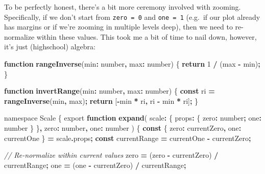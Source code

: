 \documentclass[
]{book}
\newenvironment{Shaded}{\begin{snugshade}}{\end{snugshade}}
\newcommand{\AttributeTok}[1]{\textcolor[rgb]{0.13,0.29,0.53}{#1}}
\newcommand{\CommentTok}[1]{\textcolor[rgb]{0.56,0.35,0.01}{\textit{#1}}}
\newcommand{\ControlFlowTok}[1]{\textcolor[rgb]{0.13,0.29,0.53}{\textbf{#1}}}
\newcommand{\DataTypeTok}[1]{\textcolor[rgb]{0.13,0.29,0.53}{#1}}
\newcommand{\DecValTok}[1]{\textcolor[rgb]{0.00,0.00,0.81}{#1}}
\newcommand{\FunctionTok}[1]{\textcolor[rgb]{0.13,0.29,0.53}{\textbf{#1}}}
\newcommand{\ImportTok}[1]{#1}
\newcommand{\KeywordTok}[1]{\textcolor[rgb]{0.13,0.29,0.53}{\textbf{#1}}}
\newcommand{\NormalTok}[1]{#1}
\newcommand{\OperatorTok}[1]{\textcolor[rgb]{0.81,0.36,0.00}{\textbf{#1}}}
\theoremstyle{definition}
\theoremstyle{definition}
\theoremstyle{definition}
\theoremstyle{definition}
\theoremstyle{remark}
\begin{document}
To be perfectly honest, there's a bit more ceremony involved with zooming. Specifically, if we don't start from \texttt{zero\ =\ 0} and \texttt{one\ =\ 1} (e.g.~if our plot already has margins or if we're zooming in multiple levels deep), then we need to re-normalize within these values. This took me a bit of time to nail down, however, it's just (highschool) algebra:

\begin{Shaded}
\begin{Highlighting}[]
\KeywordTok{function} \FunctionTok{rangeInverse}\NormalTok{(min}\OperatorTok{:} \DataTypeTok{number}\OperatorTok{,}\NormalTok{ max}\OperatorTok{:} \DataTypeTok{number}\NormalTok{) \{}
  \ControlFlowTok{return} \DecValTok{1} \OperatorTok{/}\NormalTok{ (max }\OperatorTok{{-}}\NormalTok{ min)}\OperatorTok{;}
\NormalTok{\}}

\KeywordTok{function} \FunctionTok{invertRange}\NormalTok{(min}\OperatorTok{:} \DataTypeTok{number}\OperatorTok{,}\NormalTok{ max}\OperatorTok{:} \DataTypeTok{number}\NormalTok{) \{}
  \KeywordTok{const}\NormalTok{ ri }\OperatorTok{=} \FunctionTok{rangeInverse}\NormalTok{(min}\OperatorTok{,}\NormalTok{ max)}\OperatorTok{;}
  \ControlFlowTok{return}\NormalTok{ [}\OperatorTok{{-}}\NormalTok{min }\OperatorTok{*}\NormalTok{ ri}\OperatorTok{,}\NormalTok{ ri }\OperatorTok{{-}}\NormalTok{ min }\OperatorTok{*}\NormalTok{ ri]}\OperatorTok{;}
\NormalTok{\}}

\ImportTok{namespace} \DataTypeTok{Scale}\NormalTok{ \{}
  \ImportTok{export} \KeywordTok{function} \FunctionTok{expand}\NormalTok{(}
\NormalTok{    scale}\OperatorTok{:}\NormalTok{ \{ props}\OperatorTok{:}\NormalTok{ \{ zero}\OperatorTok{:} \DataTypeTok{number}\OperatorTok{;}\NormalTok{ one}\OperatorTok{:} \DataTypeTok{number}\NormalTok{ \} \}}\OperatorTok{,}
\NormalTok{    zero}\OperatorTok{:} \DataTypeTok{number}\OperatorTok{,}
\NormalTok{    one}\OperatorTok{:} \DataTypeTok{number}
\NormalTok{  ) \{}
    \KeywordTok{const}\NormalTok{ \{ zero}\OperatorTok{:}\NormalTok{ currentZero}\OperatorTok{,}\NormalTok{ one}\OperatorTok{:}\NormalTok{ currentOne \} }\OperatorTok{=}\NormalTok{ scale}\OperatorTok{.}\AttributeTok{props}\OperatorTok{;}
    \KeywordTok{const}\NormalTok{ currentRange }\OperatorTok{=}\NormalTok{ currentOne }\OperatorTok{{-}}\NormalTok{ currentZero}\OperatorTok{;}
    
    \CommentTok{// Re{-}normalize within current values}
\NormalTok{    zero }\OperatorTok{=}\NormalTok{ (zero }\OperatorTok{{-}}\NormalTok{ currentZero) }\OperatorTok{/}\NormalTok{ currentRange}\OperatorTok{;}
\NormalTok{    one }\OperatorTok{=}\NormalTok{ (one }\OperatorTok{{-}}\NormalTok{ currentZero) }\OperatorTok{/}\NormalTok{ currentRange}\OperatorTok{;}


\end{Highlighting}
\end{Shaded}
\end{document}
